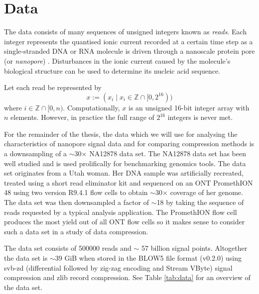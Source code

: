 \chapter{Data} \label{chap:data}

The data consists of many sequences of unsigned integers known as \textit{reads}. Each integer represents the quantised ionic current recorded at a certain time step as a single-stranded DNA or RNA molecule is driven through a nanoscale protein pore (or \textit{nanopore}) \cite{Wang2021}. Disturbances in the ionic current caused by the molecule's biological structure can be used to determine its nucleic acid sequence.

Let each read be represented by
\[ x := (x_i\mid x_i \in \mathbb{Z} \cap [0, 2^{16})) \]
where $i\in \mathbb{Z}\cap [0, n)$. Computationally, $x$ is an unsigned 16-bit integer array with $n$ elements. However, in practice the full range of $2^{16}$ integers is never met.

For the remainder of the thesis, the data which we will use for analysing the characteristics of nanopore signal data and for comparing compression methods is a downsampling of a $\sim$30$\times$ NA12878 data set. The NA12878 data set has been well studied and is used prolifically for benchmarking genomics tools. The data set originates from a Utah woman. Her DNA sample was artificially recreated, treated using a short read eliminator kit and sequenced on an ONT PromethION 48 using two version R9.4.1 flow cells to obtain $\sim$30$\times$ coverage of her genome. The data set was then downsampled a factor of $\sim$18 by taking the sequence of reads requested by a typical analysis application.
The PromethION flow cell produces the most yield out of all ONT flow cells so it makes sense to consider such a data set in a study of data compression.

The data set consists of \num{500000} reads and $\sim$ 57 billion signal points. Altogether the data set is $\sim$39 GiB when stored in the BLOW5 file format (v0.2.0) using svb-zd (differential followed by zig-zag encoding and Stream VByte) signal compression and zlib record compression. See Table \ref{tab:data} for an overview of the data set.



